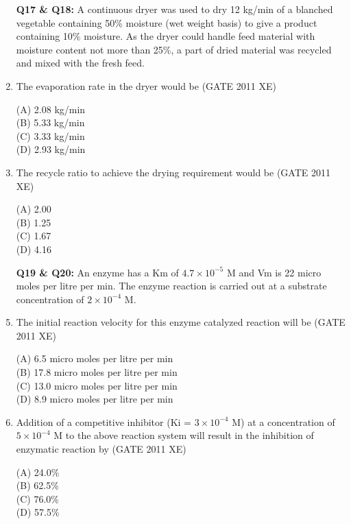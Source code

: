\documentclass[journal,12pt,onecolumn]{IEEEtran}
\begin{document}
\begin{enumerate}
\begin{enumerate}
\begin{enumerate}
\item[\textbf{Q17 \& Q18:}] A continuous dryer was used to dry 12 kg/min of a blanched vegetable containing 50\% moisture (wet weight basis) to give a product containing 10\% moisture. As the dryer could handle feed material with moisture content not more than 25\%, a part of dried material was recycled and mixed with the fresh feed.\\

 \item The evaporation rate in the dryer would be
\hfill{(GATE 2011 XE)} \\
\begin{multicols}{2}
(A) 2.08 kg/min \\
(B) 5.33 kg/min \\
(C) 3.33 kg/min \\
(D) 2.93 kg/min
\end{multicols}

\item The recycle ratio to achieve the drying requirement would be
\hfill{(GATE 2011 XE)} \\
\begin{multicols}{2}
(A) 2.00 \\
(B) 1.25 \\
(C) 1.67 \\
(D) 4.16
\end{multicols}

\item[\textbf{Q19 \& Q20:}] An enzyme has a Km of \(4.7 \times 10^{-5}\) M and Vm is 22 micro moles per litre per min. The enzyme reaction is carried out at a substrate concentration of \(2 \times 10^{-4}\) M.\\

\item The initial reaction velocity for this enzyme catalyzed reaction will be
\hfill{(GATE 2011 XE)} \\
\begin{multicols}{2}
(A) 6.5 micro moles per litre per min \\
(B) 17.8 micro moles per litre per min \\
(C) 13.0 micro moles per litre per min \\
(D) 8.9 micro moles per litre per min
\end{multicols}

\newpage 

\item Addition of a competitive inhibitor (Ki = $3 \times 10^{-4}$ M) at a concentration of $5 \times 10^{-4}$ M to the above reaction system will result in the inhibition of enzymatic reaction by
\hfill{(GATE 2011 XE)} \\
\begin{multicols}{2}
(A) 24.0\% \\
(B) 62.5\% \\
(C) 76.0\% \\
(D) 57.5\%
\end{multicols}


\end{enumerate}
\end{enumerate}
\end{enumerate}
\end{document}
